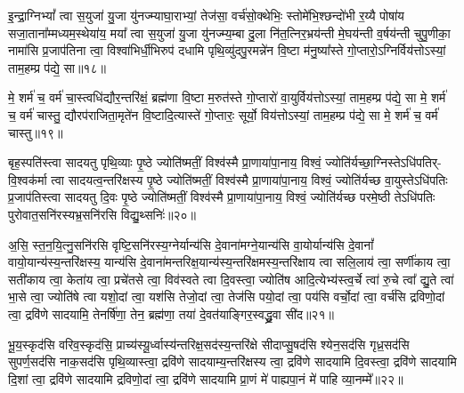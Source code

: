 {}

इ॒न्द्रा॒ग्नि\-भ्यां᳚ त्वा स॒युजा॑ यु॒जा यु॑नज्म्याघा॒राभ्यां॒ तेज॑सा॒ वर्च॑सो॒क्थेभिः॒ स्तोमे॑भि॒श्छन्दो॑भी र॒य्यै पोषा॑य सजा॒ताना᳚म्मध्यम॒स्थेया॑य॒ मया᳚ त्वा स॒युजा॑ यु॒जा यु॑नज्म्य॒म्बा दु॒ला नि॑त॒त्निर॒भ्रय॑न्ती मे॒घय॑न्ती व॒र्\mbox{}षय॑न्ती चुपु॒णीका॒ नामा॑सि प्र॒जाप॑तिना त्वा॒ विश्वा॑भिर्धी॒भिरुप॑ दधामि पृथि॒व्यु॑दपु॒रमन्ने॑न वि॒ष्टा म॑नु॒ष्या᳚स्ते गो॒प्तारो॒\-ऽग्निर्विय॑त्तो\-ऽस्यां॒ ताम॒हम्प्र प॑द्ये॒ सा॥१८॥

मे॒ शर्म॑ च॒ वर्म॑ चा॒स्त्वधि॑द्यौर॒न्तरि॑क्षं॒ ब्रह्म॑णा वि॒ष्टा म॒रुत॑स्ते गो॒प्तारो॑ वा॒युर्विय॑त्तो\-ऽस्यां॒ ताम॒हम्प्र प॑द्ये॒ सा मे॒ शर्म॑ च॒ वर्म॑ चास्तु॒ द्यौरप॑राजिता॒मृते॑न वि॒ष्टादि॒त्यास्ते॑ गो॒प्तारः॒ सूर्यो॒ विय॑त्तो\-ऽस्यां॒ ताम॒हम्प्र प॑द्ये॒ सा मे॒ शर्म॑ च॒ वर्म॑ चास्तु॥१९॥

{\anuvakamend[{सा\-ऽष्टाच॑त्वारिꣳशच्च॥५॥}]}

बृह॒स्पति॑स्त्वा सादयतु पृथि॒व्याः पृ॒ष्ठे ज्योति॑ष्मतीं॒ विश्व॑स्मै प्रा॒णाया॑पा॒नाय॒ विश्वं॒ ज्योति॑र्यच्छा॒ग्निस्ते\-ऽधि॑पतिर्- वि॒श्वक॑र्मा त्वा सादयत्व॒न्तरि॑क्षस्य पृ॒ष्ठे ज्योति॑ष्मतीं॒ विश्व॑स्मै प्रा॒णाया॑पा॒नाय॒ विश्वं॒ ज्योति॑र्यच्छ वा॒युस्ते\-ऽधि॑पतिः प्र॒जाप॑तिस्त्वा सादयतु दि॒वः पृ॒ष्ठे ज्योति॑ष्मतीं॒ विश्व॑स्मै प्रा॒णाया॑पा॒नाय॒ विश्वं॒ ज्योति॑र्यच्छ परमे॒ष्ठी ते\-ऽधि॑पतिः पुरोवात॒सनि॑रस्यभ्र॒सनि॑रसि विद्यु॒थ्सनिः॑॥२०॥

अ॒सि॒ स्त॒न॒यि॒त्नु॒सनि॑रसि वृष्टि॒सनि॑रस्य॒ग्नेर्यान्य॑सि दे॒वाना॑मग्ने॒यान्य॑सि वा॒योर्यान्य॑सि दे॒वानां᳚ वायो॒यान्य॑स्य॒न्तरि॑क्षस्य॒ यान्य॑सि दे॒वाना॑मन्तरिक्ष॒यान्य॑स्य॒न्तरि॑क्षमस्य॒न्तरि॑क्षाय त्वा सलि॒लाय॑ त्वा॒ सर्णी॑काय त्वा॒ सती॑काय त्वा॒ केता॑य त्वा॒ प्रचे॑तसे त्वा॒ विव॑स्वते त्वा दि॒वस्त्वा॒ ज्योति॑ष आदि॒त्येभ्य॑स्त्व॒र्चे त्वा॑ रु॒चे त्वा᳚ द्यु॒ते त्वा॑ भा॒से त्वा॒ ज्योति॑षे त्वा यशो॒दां त्वा॒ यश॑सि तेजो॒दां त्वा॒ तेज॑सि पयो॒दां त्वा॒ पय॑सि वर्चो॒दां त्वा॒ वर्च॑सि द्रविणो॒दां त्वा॒ द्रवि॑णे सादयामि॒ तेनर्\mbox{}षि॑णा॒ तेन॒ ब्रह्म॑णा॒ तया॑ दे॒वत॑याङ्गिर॒स्वद्ध्रु॒वा सी॑द॥२१॥

{\anuvakamend[{वि॒द्यु॒थ्सनि॑र्द्यु॒त्वैका॒न्नत्रि॒ꣳ॒शच्च॑॥६॥}]}

भू॒य॒स्कृद॑सि वरिव॒स्कृद॑सि॒ प्राच्य॑स्यू॒र्ध्वास्य॑न्तरिक्ष॒सद॑स्य॒न्तरि॑क्षे सीदाप्सु॒षद॑सि श्येन॒सद॑सि गृध्र॒सद॑सि सुपर्ण॒सद॑सि नाक॒सद॑सि पृथि॒व्यास्त्वा॒ द्रवि॑णे सादयाम्य॒न्तरि॑क्षस्य त्वा॒ द्रवि॑णे सादयामि दि॒वस्त्वा॒ द्रवि॑णे सादयामि दि॒शां त्वा॒ द्रवि॑णे सादयामि द्रविणो॒दां त्वा॒ द्रवि॑णे सादयामि प्रा॒णं मे॑ पाह्यपा॒नं मे॑ पाहि व्या॒नम्मे᳚॥२२॥

